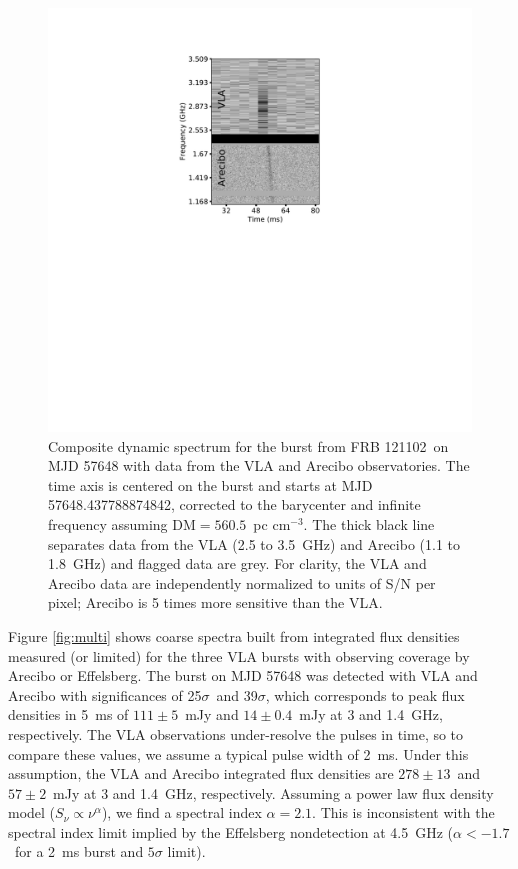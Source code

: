 \documentclass[twocolumn]{aastex61}
\newcommand{\frb}{FRB 121102}
\begin{document}
\begin{figure}[htb]
\begin{center}
 \includegraphics[trim=250 400 250 80, clip, width=\columnwidth]{aovla_spec.pdf}
 \caption{Composite dynamic spectrum for the burst from \frb\ on MJD 57648 with data from the VLA and Arecibo observatories. The time axis is centered on the burst and starts at MJD 57648.437788874842, corrected to the barycenter and infinite frequency assuming DM$=560.5$\ pc cm$^{-3}$. The thick black line separates data from the VLA (2.5 to 3.5~GHz) and Arecibo (1.1 to 1.8~GHz) and flagged data are grey. For clarity, the VLA and Arecibo data are independently normalized to units of S/N per pixel; Arecibo is 5 times more sensitive than the VLA.
 \label{fig:sgram}}
\end{center}
\end{figure}

Figure \ref{fig:multi} shows coarse spectra built from integrated flux densities measured (or limited) for the three VLA bursts with observing coverage by Arecibo or Effelsberg. The burst on MJD 57648 was detected with VLA and Arecibo with significances of 25$\sigma$\ and 39$\sigma$, which corresponds to peak flux densities in 5~ms of $111\pm5$\ mJy and $14\pm0.4$\ mJy at 3 and 1.4~GHz, respectively. The VLA observations under-resolve the pulses in time, so to compare these values, we assume a typical pulse width of 2~ms. Under this assumption, the VLA and Arecibo integrated flux densities are $278\pm13$\ and $57\pm2$\ mJy at 3 and 1.4~GHz, respectively. Assuming a power law flux density model ($S_{\nu} \propto \nu^{\alpha}$), we find a spectral index $\alpha=2.1$. This is inconsistent with the spectral index limit implied by the Effelsberg nondetection at 4.5~GHz ($\alpha<-1.7$\ for a 2~ms burst and $5\sigma$ limit).
\end{document}
